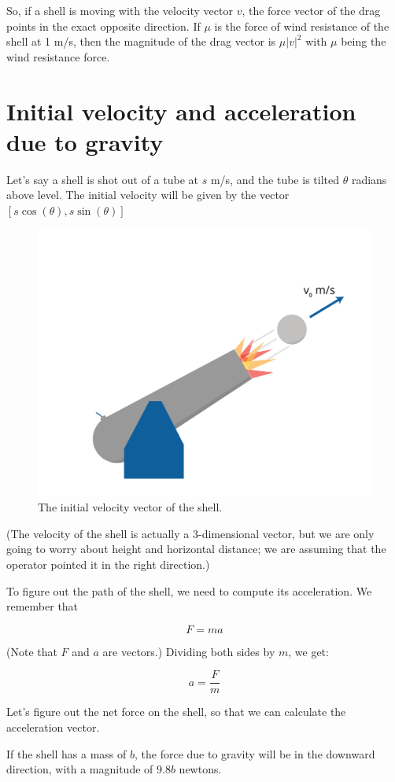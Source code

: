 So, if a shell is moving with the velocity vector $v$, the force
vector of the drag points in the exact opposite direction. If $\mu$ is
the force of wind resistance of the shell at 1 m/s, then the magnitude
of the drag vector is $\mu |v|^2$ with $\mu$ being the wind resistance force.

\section{Initial velocity and acceleration due to gravity}

Let's say a shell is shot out of a tube at $s$ m/s, and the tube
is tilted $\theta$ radians above level. The initial velocity
will be given by the vector $[s \cos(\theta), s \sin(\theta)]$

\begin{figure}[htbp]
    \centering
    \includegraphics[width=.5\textwidth]{cannonvi.png}
    \caption{The initial velocity vector of the shell.}
    \label{fig:cannonvi}
\end{figure}



(The velocity of the shell is actually a 3-dimensional vector, but we
are only going to worry about height and horizontal distance; we are
assuming that the operator pointed it in the right direction.)

To figure out the path of the shell, we need to compute its acceleration. We remember that

$$F = m a$$

(Note that $F$ and $a$ are vectors.)  Dividing both sides by $m$, we get:

$$a = \frac{F}{m}$$

Let's figure out the net force on the shell, so that we can calculate the acceleration vector.

If the shell has a mass of $b$, the force due to gravity will be in the
downward direction, with a magnitude of $9.8 b$ newtons.


